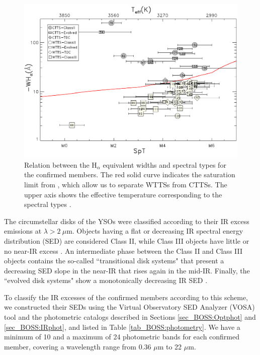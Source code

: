 \documentclass[12pt]{article}
\newcounter{subsubsubsection}[subsubsection]
\begin{document}
\begin{figure}[ht!]
	\begin{minipage}{0.60\textwidth}
		\includegraphics[width=1.0\textwidth]{f7.pdf}
	\end{minipage} \hfill
	\begin{minipage}{0.35\textwidth}
		\caption[TTS classification of the confirmed members from the BOSS spectra]{Relation between the H$_\alpha$ equivalent widths and spectral types for the confirmed members. The red solid curve indicates the saturation limit from \citet{BarradoYNavascues-Martin2003}, which allow us to separate WTTSs from CTTSs. The upper axis shows the effective temperature corresponding to the spectral types \citep{Luhman2003b}.}
		\label{fig_BOSS:WHavsSpT}
	\end{minipage}
\end{figure}

\label{sec_BOSS:SED}

The circumstellar disks of the YSOs were classified according to their IR excess emissions at $\lambda>2\ \mu$m. Objects having a flat or decreasing IR spectral energy distribution (\ac{SED}) are considered Class II, while Class III objects have little or no near-IR excess \citep{Lada-Wilking1984,Lada1987}. An intermediate phase between the Class II and Class III objects contains the so-called ``transitional disk systems" that present a decreasing SED slope in the near-IR that rises again in the mid-IR. Finally, the ``evolved disk systems" show a monotonically decreasing IR SED \citep[e.g.,][]{Hernandez2007b}.

To classify the IR excesses of the confirmed members according to this scheme, we constructed their SEDs using the Virtual Observatory SED Analyzer (\ac{VOSA}) tool \citep{Bayo2008} and the photometric catalogs described in Sections \ref{sec_BOSS:Optphot} and \ref{sec_BOSS:IRphot}, and listed in Table \ref{tab_BOSS:photometry}. We have a minimum of 10 and a maximum of 24 photometric bands for each confirmed member, covering a wavelength range from 0.36 $\mu$m to 22 $\mu$m.
\end{document}
